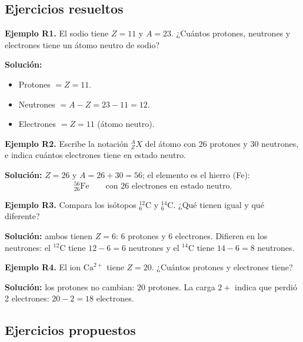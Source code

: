 \documentclass[12pt, letterpaper]{article}
\begin{document}
\subsection{Ejercicios resueltos}

\textbf{Ejemplo R1.} El sodio tiene $Z = 11$ y $A = 23$. ¿Cuántos protones, neutrones y electrones tiene un átomo neutro de sodio?

\begin{cuadrosolucion}
  \textbf{Solución:}
  \begin{itemize}
    \item Protones $= Z = 11$.
    \item Neutrones $= A - Z = 23 - 11 = 12$.
    \item Electrones $= Z = 11$ (átomo neutro).
  \end{itemize}
\end{cuadrosolucion}

\textbf{Ejemplo R2.} Escribe la notación ${}^{A}_{Z}X$ del átomo con 26 protones y 30 neutrones, e indica cuántos electrones tiene en estado neutro.

\begin{cuadrosolucion}
  \textbf{Solución:} $Z = 26$ y $A = 26 + 30 = 56$; el elemento es el hierro (Fe):
  $${}^{56}_{26}\text{Fe} \qquad \text{con 26 electrones en estado neutro.}$$
\end{cuadrosolucion}

\textbf{Ejemplo R3.} Compara los isótopos ${}^{12}_{6}\text{C}$ y ${}^{14}_{6}\text{C}$. ¿Qué tienen igual y qué diferente?

\begin{cuadrosolucion}
  \textbf{Solución:} ambos tienen $Z = 6$: 6 protones y 6 electrones. Difieren en los neutrones: el ${}^{12}\text{C}$ tiene $12 - 6 = 6$ neutrones y el ${}^{14}\text{C}$ tiene $14 - 6 = 8$ neutrones.
\end{cuadrosolucion}

\textbf{Ejemplo R4.} El ion $\text{Ca}^{2+}$ tiene $Z = 20$. ¿Cuántos protones y electrones tiene?

\begin{cuadrosolucion}
  \textbf{Solución:} los protones no cambian: $20$ protones. La carga $2+$ indica que perdió 2 electrones: $20 - 2 = 18$ electrones.
\end{cuadrosolucion}

\subsection{Ejercicios propuestos}
\end{document}
